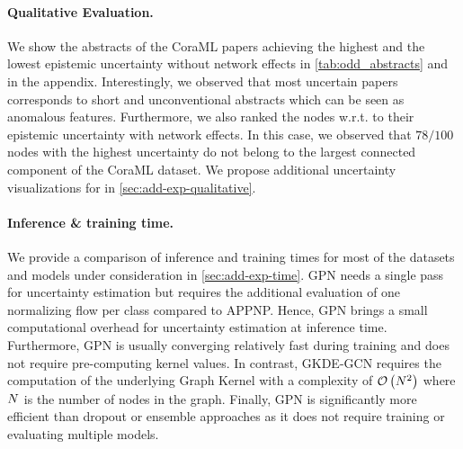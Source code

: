 \paragraph{Qualitative Evaluation.} We show the abstracts of the CoraML papers achieving the highest and the lowest epistemic uncertainty without network effects in \cref{tab:odd_abstracts} and in the appendix. Interestingly, we observed that most uncertain papers corresponds to short and unconventional abstracts which can be seen as anomalous features. Furthermore, we also ranked the nodes w.r.t. to their epistemic uncertainty with network effects. In this case, we observed that $78/100$ nodes with the highest uncertainty do not belong to the largest connected component of the CoraML dataset. We propose additional uncertainty visualizations for \GPNacro{} in \cref{sec:add-exp-qualitative}. 

\paragraph{Inference \& training time.} We provide a comparison of inference and training times for most of the datasets and models under consideration in \cref{sec:add-exp-time}. GPN needs a single pass for uncertainty estimation but requires the additional evaluation of one normalizing flow per class compared to APPNP. Hence, GPN brings a small computational overhead for uncertainty estimation at inference time. Furthermore, GPN is usually converging relatively fast during training and does not require pre-computing kernel values. In contrast, GKDE-GCN \citep{Zhao2020} requires the computation of the underlying Graph Kernel with a complexity of $\mathcal{O}\left(N^2\right)$ where $N$ is the number of nodes in the graph. Finally, GPN is significantly more efficient than dropout or ensemble approaches as it does not require training or evaluating multiple models.


